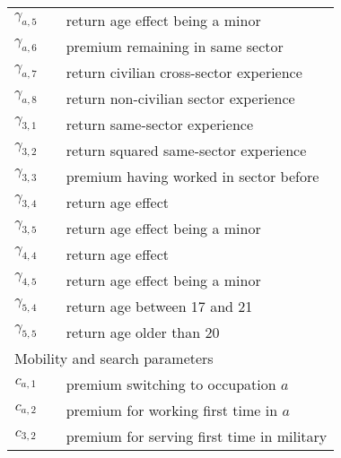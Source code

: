 \begin{ThreePartTable}
\begin{longtable}{@{}cll@{}}
$\gamma_{a,5}$       &  & return age effect being a minor               										\\
$\gamma_{a,6}$       &  & premium remaining in same sector              								   \\
$\gamma_{a,7}$       &  & return civilian cross-sector experience       								    \\
$\gamma_{a,8}$       &  & return non-civilian sector experience       										 \\
$\gamma_{3,1}$       &  & return same-sector experience                 									  \\
$\gamma_{3,2}$       &  & return squared same-sector experience    										 \\
$\gamma_{3,3}$       &  & premium having worked in sector before   										\\
$\gamma_{3,4}$       &  & return age effect                             												 \\
$\gamma_{3,5}$       &  & return age effect being a minor              	   										\\
$\gamma_{4,4}$       &  & return age effect                             												 \\
$\gamma_{4,5}$       &  & return age effect being a minor                  										\\
$\gamma_{5,4}$       &  & return age between 17 and 21                 	  									   \\
$\gamma_{5,5}$       &  & return age older than 20							   										\\[7.5pt] \midrule
\multicolumn{3}{l}{Mobility and search parameters}          													  \\ \midrule 
$c_{a,1}$            &  & premium switching to occupation $a$           									   \\
$c_{a,2}$            &  & premium for working first time in $a$         										  \\
$c_{3,2}$            &  & premium for serving first time in military    										  \\[7.5pt]


\end{longtable}
\end{ThreePartTable}
